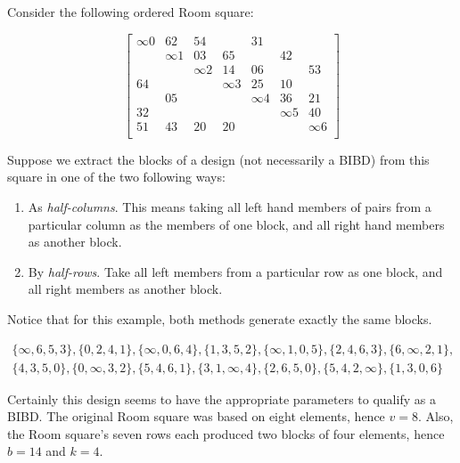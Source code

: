 \documentclass[11pt, a4paper]{book}\usepackage[]{graphicx}\usepackage[]{xcolor}
\newcounter{example}
\begin{document}
Consider the following ordered Room square:

\begin{equation}
  \begin{bmatrix}
    \infty 0 &    62    &    54    &            &    31    &            &          \\
             & \infty 1 &    03    &     65     &          &     42     &          \\
             &          & \infty 2 &     14     &    06    &            &    53    \\
      64     &          &          &  \infty 3  &    25    &     10     &          \\
             &    05    &          &            & \infty 4 &     36     &    21    \\
      32     &          &          &            &          &  \infty 5  &    40    \\
      51     &    43    &    20    &     20     &          &            & \infty 6 \\
  \end{bmatrix}
\end{equation}

Suppose we extract the blocks of a design (not necessarily a
BIBD) from this square in one of the two following ways:

\begin{enumerate}
 \item{As \emph{half-columns}. This means taking all left hand
    members of pairs from a particular column as the members
    of one block, and all right hand members as another
    block.}
 \item{By \emph{half-rows}. Take all left members from a particular
    row as one block, and all right members as another
    block.}
\end{enumerate}

Notice that for this example, both methods generate exactly
the same blocks.

\begin{equation}
\begin{split}
\{\infty,6,5,3\},\{0,2,4,1\},\{\infty,0,6,4\},\{1,3,5,2\},\{\infty,1,0,5\},\{2,4,6,3\},\{6, \infty,2,1\}, \\
\{4,3,5,0\},\{0,\infty,3,2\},\{5,4,6,1\},\{3,1,\infty,4\},\{2,6,5,0\},\{5,4,2,\infty\},\{1, 3,0,6\}
\end{split}
\end{equation}

Certainly this design seems to have the appropriate
parameters to qualify as a BIBD. The original Room square
was based on eight elements, hence $v = 8$. Also, the Room
square’s seven rows each produced two blocks of four elements,
hence $b = 14$ and $k = 4$.
\end{document}
